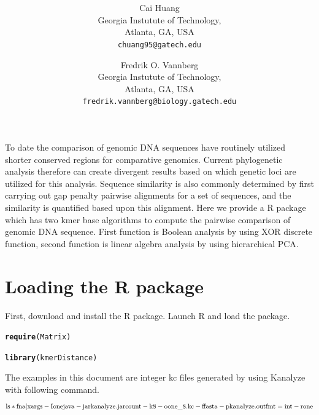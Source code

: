 \documentclass{article}\usepackage[]{graphicx}\usepackage[]{color}
\title{}
\title{\textsf{\textbf{\thetitle}}}
\author{
	Cai Huang\\[1em]Georgia Instutute of Technology,\\ Atlanta, GA, USA\\ \texttt{chuang95@gatech.edu}
	\and
	Fredrik O. Vannberg\\[1em]Georgia Instutute of Technology,\\ Atlanta, GA, USA\\ \texttt{fredrik.vannberg@biology.gatech.edu}
}
\makeatletter
\newcommand{\hlstd}[1]{\textcolor[rgb]{0.345,0.345,0.345}{#1}}%
\newcommand{\hlkwd}[1]{\textcolor[rgb]{0.737,0.353,0.396}{\textbf{#1}}}%
\newenvironment{kframe}{%
 \def\at@end@of@kframe{}%
 \ifinner\ifhmode%
  \def\at@end@of@kframe{\end{minipage}}%
  \begin{minipage}{\columnwidth}%
 \fi\fi%
 \def\FrameCommand##1{\hskip\@totalleftmargin \hskip-\fboxsep
 \colorbox{shadecolor}{##1}\hskip-\fboxsep
     \hskip-\linewidth \hskip-\@totalleftmargin \hskip\columnwidth}%
 \MakeFramed {\advance\hsize-\width
   \@totalleftmargin\z@ \linewidth\hsize
   \@setminipage}}%
 {\par\unskip\endMakeFramed%
 \at@end@of@kframe}
\newenvironment{knitrout}{}{} %
\makeatother
\begin{document}
\maketitle


\abstract

To date the comparison of genomic DNA sequences have routinely utilized shorter conserved regions for comparative genomics. Current phylogenetic analysis therefore can create divergent results based on which genetic loci are utilized for this analysis. Sequence similarity is also commonly determined by first carrying out gap penalty pairwise alignments for a set of sequences, and the similarity is quantified based upon this alignment. Here we provide a R package which has two kmer base algorithms to compute the pairwise comparison of genomic DNA sequence. First function is Boolean analysis by using XOR discrete function, second function is linear algebra analysis by using hierarchical PCA.


\tableofcontents


\section{Loading the R package}
\label{sec.loading}

First, download and install the  R package. Launch R and load the package.

\begin{knitrout}
\color{fgcolor}\begin{kframe}
\begin{alltt}
\hlkwd{require}\hlstd{(Matrix)}
\end{alltt}


{\ttfamily\noindent\itshape\color{messagecolor}{\#\# Loading required package: Matrix\\\#\# Loading required package: methods}}\begin{alltt}
\hlkwd{library}\hlstd{(kmerDistance)}
\end{alltt}
\end{kframe}
\end{knitrout}

The examples in this document are integer kc files generated by using Kanalyze\cite{Audano:2014aa} with following command.
\[{\rm{ls *fna | xargs  - I one java  - jar kanalyze.jar count  - k 8  - o one\_8.kc  - f fasta  - p kanalyze.outfmt = int  - r one}}\]
\end{document}
